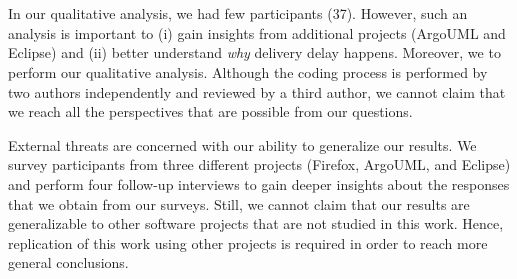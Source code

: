 \section{\DIFdelbegin {}\DIFdelend \DIFaddbegin {}\DIFaddend } \label{ch6:threats}

\textbf{\DIFdelbegin \textit{}%
\DIFdelend \DIFaddbegin \textit{}\DIFaddend } In our qualitative analysis, we had few
participants (37). However, such an analysis is important to (i) gain insights
from \DIFaddbegin {}\DIFaddend additional projects (ArgoUML and Eclipse) and (ii) better
understand {\em why} delivery delay happens. Moreover, we \DIFdelbegin {}\DIFdelend \DIFaddbegin {}\DIFaddend to
perform our qualitative analysis. Although the coding process is performed by
two authors independently and reviewed by a third author, we cannot claim that
we reach all the perspectives that are possible from our questions.

\textbf{\DIFdelbegin \textit{}%
\DIFdelend \DIFaddbegin \textit{}\DIFaddend } External threats are concerned
with our ability to generalize our results. We survey participants from three
different projects (Firefox, ArgoUML, and Eclipse) and perform four follow-up
interviews to gain deeper insights about the responses that we obtain from our
surveys.  Still, we cannot claim that our results are generalizable to other
software projects that are not studied in this work.  Hence, replication of this
work using other projects is required in order to reach more general
conclusions.

